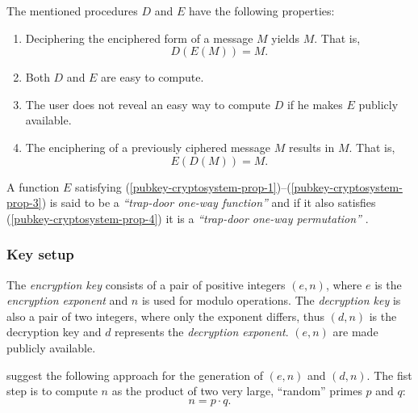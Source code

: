 The mentioned procedures $D$ and $E$ have the following properties:
\begin{enumerate}
\renewcommand{\theenumi}{\alph{enumi}}
\renewcommand{\labelenumi}{(\theenumi)}

\item Deciphering  the enciphered form of  a message $M$  yields $M$. That
  is,
  \begin{equation}
    \label{eq:1}
    D(E(M)) = M.
  \end{equation}
  \label{pubkey-cryptosystem-prop-1}
\item Both $D$ and $E$ are easy to compute.
  \label{pubkey-cryptosystem-prop-2}
\item The user does not reveal an  easy way to compute $D$ if he makes $E$
  publicly available.
  \label{pubkey-cryptosystem-prop-3}
\item  The enciphering  of a  previously ciphered  message $M$  results in
  $M$. That is,
  \begin{equation}
    \label{eq:1}
    E(D(M)) = M.
  \end{equation}
  \label{pubkey-cryptosystem-prop-4}
\end{enumerate}

A                  function                 $E$                 satisfying
(\ref{pubkey-cryptosystem-prop-1})--(\ref{pubkey-cryptosystem-prop-3})   is
said  to  be  a  \emph{``trap-door  one-way function''}  and  if  it  also
satisfies  (\ref{pubkey-cryptosystem-prop-4})  it  is a  \emph{``trap-door
  one-way permutation''} \cite{rivest77method,diffie76new}.

\subsubsection{Key setup}

The \emph{encryption  key} consists  of a pair  of positive  integers $(e,
n)$,  where $e$  is the  \emph{encryption exponent}  and $n$  is  used for
modulo  operations.  The \emph{decryption  key}  is  also  a pair  of  two
integers, where only the exponent differs, thus $(d, n)$ is the decryption
key and $d$  represents the \emph{decryption exponent}. $(e,  n)$ are made
publicly available.

\citet*{rivest77method} suggest the  following approach for the generation
of $(e, n)$ and  $(d, n)$. The fist step is to  compute $n$ as the product
of two very large, ``random'' primes $p$ and $q$:
\begin{equation*}
n = p \cdot q.
\end{equation*}

